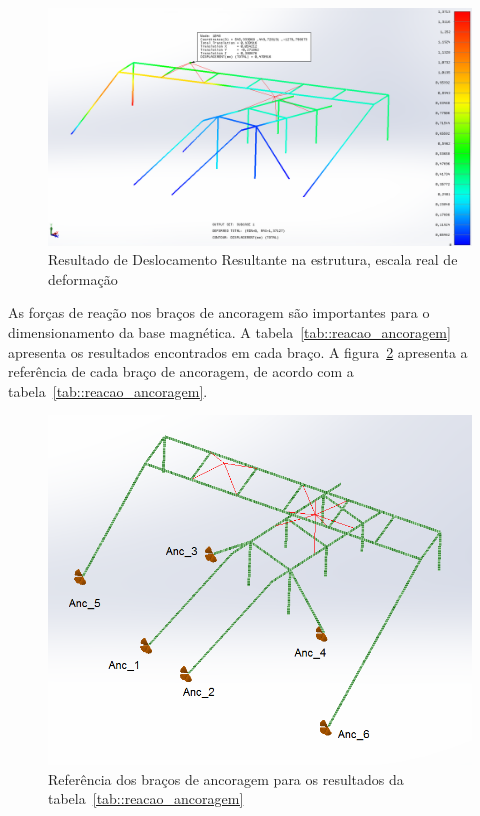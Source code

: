 \begin{figure}[h!]
	\centering
	\includegraphics[width=0.9\columnwidth]{figs/dimensionamento/deslocamento}
	\caption{Resultado de Deslocamento Resultante na estrutura, escala real de
	deformação}
    \label{fig::deslocamento}
\end{figure}


As forças de reação nos braços de ancoragem são importantes para o
dimensionamento da base magnética. A tabela~\ref{tab::reacao_ancoragem}
apresenta os resultados encontrados em cada braço. A
figura~\ref{fig::mapa_forcas} apresenta a referência de cada braço de
ancoragem, de acordo com a tabela~\ref{tab::reacao_ancoragem}.

\begin{figure}[h!]
	\centering
	\includegraphics[width=0.8\columnwidth]{figs/dimensionamento/mapa_forcas}
	\caption{Referência dos braços de ancoragem para os resultados da
	tabela~\ref{tab::reacao_ancoragem}}
    \label{fig::mapa_forcas}
\end{figure}

